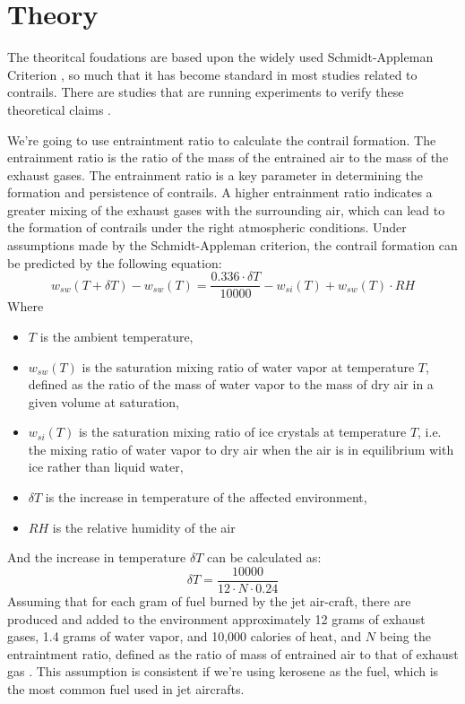 \documentclass[a4paper, 12pt]{report}
\begin{document}
\section{Theory}
The theoritcal foudations are based upon the widely used Schmidt-Appleman Criterion \cite{appleman1953formation}, so much that it has become standard in most studies related to contrails. There are studies that are running experiments to verify these theoretical claims \cite{ghedhaifi2019influence}.

We're going to use entraintment ratio to calculate the contrail formation. The entrainment ratio is the ratio of the mass of the entrained air to the mass of the exhaust gases. The entrainment ratio is a key parameter in determining the formation and persistence of contrails. A higher entrainment ratio indicates a greater mixing of the exhaust gases with the surrounding air, which can lead to the formation of contrails under the right atmospheric conditions.
Under assumptions made by the Schmidt-Appleman criterion, the contrail formation can be predicted by the following equation:
\begin{equation}
        w_{sw}(T+\delta T) - w_{sw}(T) = \frac{0.336\cdot \delta T}{10000} - w_{si}(T) + w_{sw}(T)\cdot RH
\end{equation}
Where 
\begin{itemize}[label={$\bigstar$ }]
        \item $T$ is the ambient temperature,
        \item $w_{sw}(T)$ is the saturation mixing ratio of water vapor at temperature $T$, defined as the ratio of the mass of water vapor to the mass of dry air in a given volume at saturation,
        \item $w_{si}(T)$ is the saturation mixing ratio of ice crystals at temperature $T$, i.e. the mixing ratio of water vapor to dry air when the air is in equilibrium with ice rather than liquid water, 
        \item $\delta T$ is the increase in temperature of the affected environment,
        \item $RH$ is the relative humidity of the air
\end{itemize}

And the increase in temperature $\delta T$ can be calculated as:
\begin{equation}
        \delta T = \frac{10000}{12\cdot N \cdot 0.24}
\end{equation}
Assuming that for each gram of fuel burned by the jet air-craft, there are produced and added to the environment approximately 12 grams of exhaust gases, 1.4 grams of water vapor, and 10,000 calories of heat, and $N$ being the entraintment ratio, defined as the ratio of mass of entrained air to that of exhaust gas . This assumption is consistent if we're using kerosene as the fuel, which is the most common fuel used in jet aircrafts.\\
\end{document}
